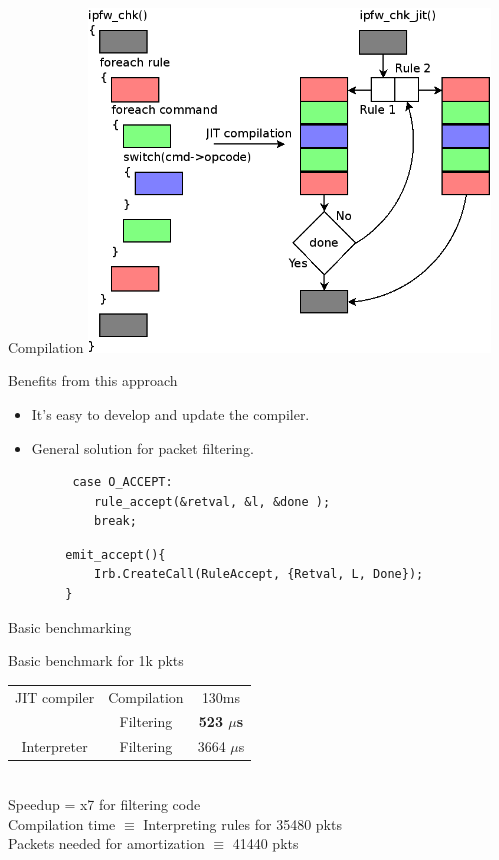 \documentclass{beamer}
\begin{document}
\begin{frame}{Compilation}
	\includegraphics[height=0.8\textheight, width=0.8\textwidth]{Figure1}
\end{frame}

\begin{frame}[fragile]{Benefits from this approach}
	\begin{itemize}
		\item \Large{It's easy to develop and update the compiler.}
		\item General solution for packet filtering.
	\end{itemize}
	\large
	\begin{block}{}
		\begin{verbatim}
		 case O_ACCEPT:
		    rule_accept(&retval, &l, &done );
		    break;
		\end{verbatim}
		\begin{verbatim}
		emit_accept(){
		    Irb.CreateCall(RuleAccept, {Retval, L, Done});
		}
		\end{verbatim}
	\end{block}
\end{frame}

\begin{frame}{Basic benchmarking}
	\Large
	\begin{center}
		Basic benchmark for 1k pkts
		\begin{tabular}{|c|c|c|}
			\hline
			JIT compiler & Compilation & 130ms \\ \cline{2-3}
			& Filtering & \textbf{523 $\mu$s} \\
			\hline
			Interpreter & Filtering & 3664 $\mu$s \\
			\hline
		\end{tabular} \\
		Speedup = x7 for filtering code \\
		Compilation time $\equiv$ Interpreting rules for 35480 pkts \\
		Packets needed for amortization $\equiv$ 41440 pkts \\
	\end{center}
\end{frame}
\end{document}
